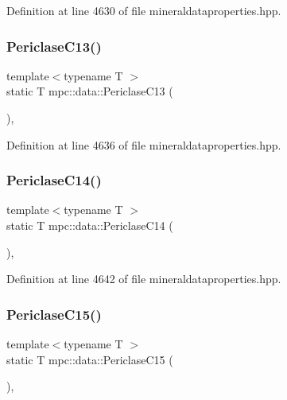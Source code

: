 Definition at line 4630 of file mineraldataproperties.\+hpp.

\mbox{\label{namespacempc_1_1data_a05b6dc33af8b3ec1162552ebda2bbdc8}} 
\subsubsection{\texorpdfstring{Periclase\+C13()}{PericlaseC13()}}
{\footnotesize\ttfamily template$<$typename T $>$ \\
static T mpc\+::data\+::\+Periclase\+C13 (\begin{DoxyParamCaption}{ }\end{DoxyParamCaption})\hspace{0.3cm}{\ttfamily [inline]}, {\ttfamily [static]}}



Definition at line 4636 of file mineraldataproperties.\+hpp.

\mbox{\label{namespacempc_1_1data_a6d8ddcf3428f4145ecef1883aa1d0105}} 
\subsubsection{\texorpdfstring{Periclase\+C14()}{PericlaseC14()}}
{\footnotesize\ttfamily template$<$typename T $>$ \\
static T mpc\+::data\+::\+Periclase\+C14 (\begin{DoxyParamCaption}{ }\end{DoxyParamCaption})\hspace{0.3cm}{\ttfamily [inline]}, {\ttfamily [static]}}



Definition at line 4642 of file mineraldataproperties.\+hpp.

\mbox{\label{namespacempc_1_1data_ac0f319b3f73405073f99abd65c033c58}} 
\subsubsection{\texorpdfstring{Periclase\+C15()}{PericlaseC15()}}
{\footnotesize\ttfamily template$<$typename T $>$ \\
static T mpc\+::data\+::\+Periclase\+C15 (\begin{DoxyParamCaption}{ }\end{DoxyParamCaption})\hspace{0.3cm}{\ttfamily [inline]}, {\ttfamily [static]}}



